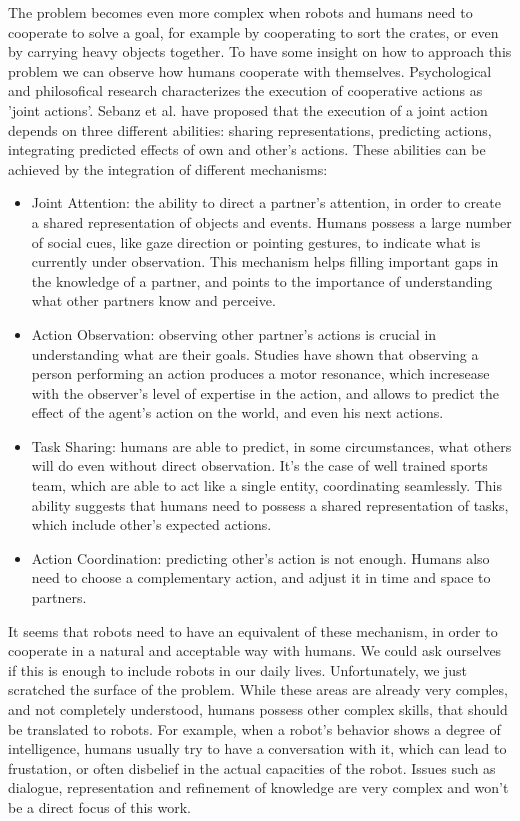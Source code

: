 The problem becomes even more complex when robots and humans need to cooperate to solve a goal, for example by cooperating to sort the crates, or even by carrying heavy objects together. To have some insight on how to approach this problem we can observe how humans cooperate with themselves. Psychological and philosofical research characterizes the execution of cooperative actions as 'joint actions'. Sebanz et al. have proposed that the execution of a joint action depends on three different abilities: sharing representations, predicting actions, integrating predicted effects of own and other's actions. These abilities can be achieved by the integration of different mechanisms:
\begin{itemize}
\item Joint Attention: the ability to direct a partner's attention, in order to create a shared representation of objects and events. Humans possess a large number of social cues, like gaze direction or pointing gestures, to indicate what is currently under observation. This mechanism helps filling important gaps in the knowledge of a partner, and points to the importance of understanding what other partners know and perceive.
\item Action Observation: observing other partner's actions is crucial in understanding what are their goals. Studies have shown that observing a person performing an action produces a motor resonance, which incresease with the observer's level of expertise in the action, and allows to predict the effect of the agent's action on the world, and even his next actions.
\item Task Sharing: humans are able to predict, in some circumstances, what others will do  even without direct observation. It's the case of well trained sports team, which are able to act like a single entity, coordinating seamlessly. This ability suggests that humans need to possess a shared representation of tasks, which include other's expected actions.
\item Action Coordination: predicting other's action is not enough. Humans also need to choose a complementary action, and adjust it in time and space to partners. 
\end{itemize}

It seems that robots need to have an equivalent of these mechanism, in order to cooperate in a natural and acceptable way with humans. We could ask ourselves if this is enough to include robots in our daily lives. Unfortunately, we just scratched the surface of the problem. While these areas are already very comples, and not completely understood, humans possess other complex skills, that should be translated to robots. For example, when a robot's behavior shows a degree of intelligence, humans usually try to have a conversation with it, which can lead to frustation, or often disbelief in the actual capacities of the robot. Issues such as dialogue, representation and refinement of knowledge are very complex and won't be a direct focus of this work.

